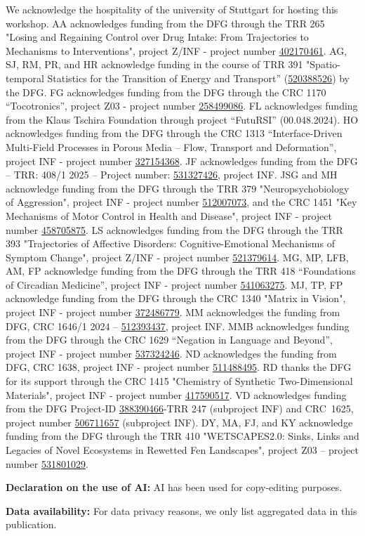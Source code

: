 \documentclass{eceasst}
\newcommand{\geprislink}[1]{\href{https://gepris.dfg.de/gepris/projekt/#1?language=en}{#1}}
\newenvironment{aiuse}{%
  \par\vspace{11pt}%
  \noindent\textbf{Declaration on the use of AI:}\enspace}{%
  \par\vspace{11pt}}
\newenvironment{data}{%
  \par\vspace{11pt}%
  \noindent\textbf{Data availability:}\enspace}{%
  \par\vspace{11pt}}
\begin{document}
\begin{acknowledge}
We acknowledge the hospitality of the university of Stuttgart for hosting this workshop.
AA acknowledges funding from the DFG through the TRR 265 "Losing and Regaining Control over Drug Intake: From Trajectories to Mechanisms to Interventions", project  Z/INF - project number \geprislink{402170461}.
AG, SJ, RM, PR, and HR acknowledge funding in the course of TRR 391 "Spatio-temporal Statistics for the Transition of Energy and Transport'' (\geprislink{520388526}) by the DFG.
FG acknowledges funding from the DFG through the CRC 1170 “Tocotronics”, project Z03 - project number \geprislink{258499086}.
FL acknowledges funding from the Klaus Tschira Foundation through project “FutuRSI” (00.048.2024).
HO acknowledges funding from the DFG through the CRC 1313 “Interface-Driven Multi-Field Processes in Porous Media – Flow, Transport and Deformation”, project INF - project number \geprislink{327154368}.
JF acknowledges funding from the DFG – TRR: 408/1 2025 – Project number: \geprislink{531327426}, project INF.
JSG and MH acknowledge funding from the DFG through the TRR 379 "Neuropsychobiology of Aggression", project INF - project number \geprislink{512007073}, and the CRC 1451 "Key Mechanisms of Motor Control in Health and Disease", project INF - project number \geprislink{458705875}.
LS acknowledges funding from the DFG through the TRR 393 "Trajectories of Affective Disorders: Cognitive-Emotional Mechanisms of Symptom Change", project  Z/INF - project number \geprislink{521379614}.
MG, MP, LFB, AM, FP acknowledge funding from the DFG through the TRR 418 ``Foundations of Circadian Medicine'', project INF - project number \geprislink{541063275}.
MJ, TP, FP acknowledge funding from the DFG through the CRC 1340 "Matrix in Vision", project INF - project number \geprislink{372486779}.
MM acknowledges the funding from DFG, CRC 1646/1 2024 -- \geprislink{512393437}, project INF.
MMB acknowledges funding from the DFG through the CRC 1629 ``Negation in Language and Beyond'', project INF - project number \geprislink{537324246}.
ND acknowledges the funding from DFG, CRC 1638, project INF - project number \geprislink{511488495}.
RD thanks the DFG for its support through the CRC 1415 "Chemistry of Synthetic Two-Dimensional Materials", project INF - project number \geprislink{417590517}.
VD acknowledges funding from the DFG Project-ID \geprislink{388390466}-TRR 247 (subproject INF) and CRC~1625, project number \geprislink{506711657} (subproject INF).
DY, MA, FJ, and KY acknowledge funding from the DFG through the TRR 410 "WETSCAPES2.0: Sinks, Links and Legacies of Novel Ecosystems in Rewetted Fen Landscapes", project Z03 -- project number \geprislink{531801029}.
\end{acknowledge}

\begin{aiuse}
AI has been used for copy-editing purposes.
\end{aiuse}

\begin{data}
For data privacy reasons, we only list aggregated data in this publication.
\end{data}



\end{document}
